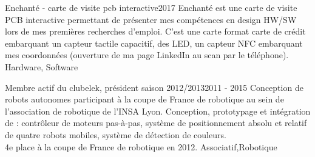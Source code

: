%
%
%


\begin{projects}
	\project
	{Enchanté - carte de visite pcb interactive}{2017}
	{ }
	{Enchanté est une carte de visite PCB interactive permettant de présenter mes compétences en design HW/SW lors de mes premières recherches d'emploi.
	C'est une carte format carte de crédit embarquant un capteur tactile capacitif, des LED, un capteur NFC embarquant mes coordonnées (ouverture de ma page LinkedIn au scan par le téléphone).}
	{Hardware, Software}
				
	\project
	{Membre actif du clubelek, président saison 2012/2013}{2011 - 2015}
	{}
	{Conception de robots autonomes participant à la coupe de France de robotique au sein de l’association de robotique de l’INSA Lyon. Conception, prototypage et intégration de : contrôleur de moteurs pas-à-pas, système de positionnement absolu et relatif de quatre robots mobiles, système de détection de couleurs.\\
		4e place à la coupe de France de robotique en 2012.}
	{Associatif,Robotique}

\end{projects}